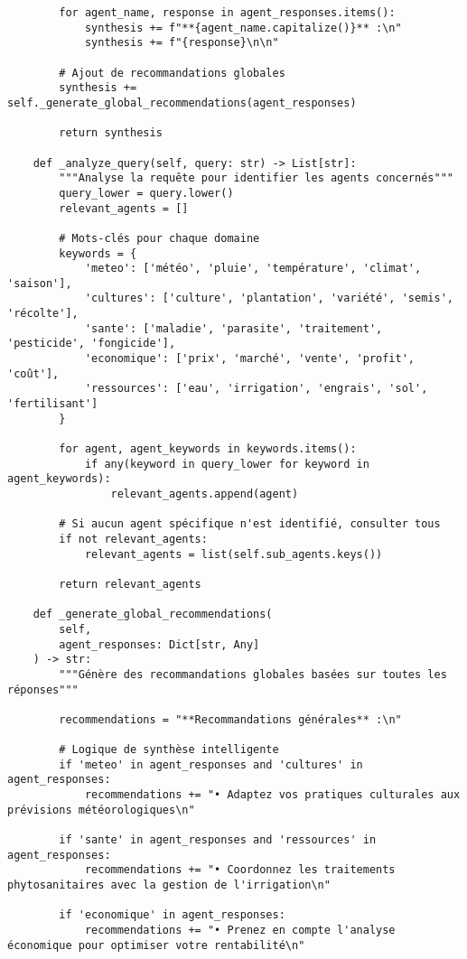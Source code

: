\begin{verbatim}
        for agent_name, response in agent_responses.items():
            synthesis += f"**{agent_name.capitalize()}** :\n"
            synthesis += f"{response}\n\n"

        # Ajout de recommandations globales
        synthesis += self._generate_global_recommendations(agent_responses)

        return synthesis

    def _analyze_query(self, query: str) -> List[str]:
        """Analyse la requête pour identifier les agents concernés"""
        query_lower = query.lower()
        relevant_agents = []

        # Mots-clés pour chaque domaine
        keywords = {
            'meteo': ['météo', 'pluie', 'température', 'climat', 'saison'],
            'cultures': ['culture', 'plantation', 'variété', 'semis', 'récolte'],
            'sante': ['maladie', 'parasite', 'traitement', 'pesticide', 'fongicide'],
            'economique': ['prix', 'marché', 'vente', 'profit', 'coût'],
            'ressources': ['eau', 'irrigation', 'engrais', 'sol', 'fertilisant']
        }

        for agent, agent_keywords in keywords.items():
            if any(keyword in query_lower for keyword in agent_keywords):
                relevant_agents.append(agent)

        # Si aucun agent spécifique n'est identifié, consulter tous
        if not relevant_agents:
            relevant_agents = list(self.sub_agents.keys())

        return relevant_agents

    def _generate_global_recommendations(
        self,
        agent_responses: Dict[str, Any]
    ) -> str:
        """Génère des recommandations globales basées sur toutes les réponses"""

        recommendations = "**Recommandations générales** :\n"

        # Logique de synthèse intelligente
        if 'meteo' in agent_responses and 'cultures' in agent_responses:
            recommendations += "• Adaptez vos pratiques culturales aux prévisions météorologiques\n"

        if 'sante' in agent_responses and 'ressources' in agent_responses:
            recommendations += "• Coordonnez les traitements phytosanitaires avec la gestion de l'irrigation\n"

        if 'economique' in agent_responses:
            recommendations += "• Prenez en compte l'analyse économique pour optimiser votre rentabilité\n"


\end{verbatim}
